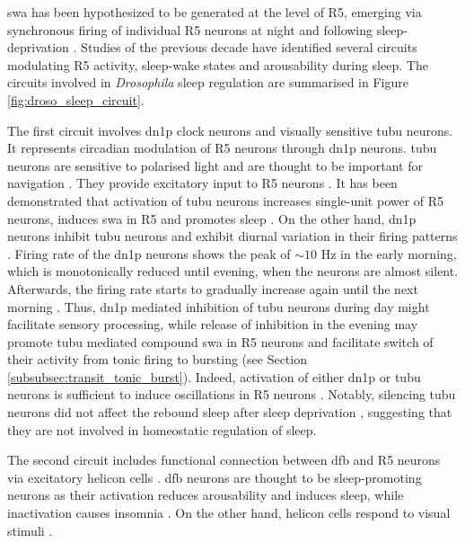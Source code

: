 \documentclass[../main.tex]{subfiles}
\begin{document}
\gls{swa} has been hypothesized to be generated at the level of R5, emerging via synchronous firing of individual R5 neurons at night and following sleep-deprivation \cite{raccugliaNetworkSpecificSynchronizationElectrical2019}.
Studies of the previous decade have identified several circuits modulating R5 activity, sleep-wake states and arousability during sleep. The circuits involved in \textit{Drosophila} sleep regulation are summarised in Figure \ref{fig:droso_sleep_circuit}.

The first circuit involves \gls{dn1p} clock neurons and visually sensitive \gls{tubu} neurons. It represents circadian modulation of R5 neurons through \gls{dn1p} neurons. \gls{tubu} neurons are sensitive to polarised light and are thought to be important for navigation \cite{suarez-grimaltNeuralArchitectureSleep2021}. They provide excitatory input to R5 neurons \cite{duanVisualPathwayCentral2023}. It has been demonstrated that activation of \gls{tubu} neurons increases single-unit power of R5 neurons, induces \gls{swa} in R5 and promotes sleep \cite{andreaniCircadianProgrammingEllipsoid2022,raccugliaNetworkSpecificSynchronizationElectrical2019}. On the other hand, \gls{dn1p} neurons inhibit \gls{tubu} neurons \cite{lamazeWakePromotingCircadianOutput2018} and exhibit diurnal variation in their firing patterns \cite{flourakisConservedBicycleModel2015}. Firing rate of the \gls{dn1p} neurons shows the peak of $\sim 10$ Hz in the early morning, which is monotonically reduced until evening, when the neurons are almost silent. Afterwards, the firing rate starts to gradually increase again until the next morning \cite{flourakisConservedBicycleModel2015}. Thus, \gls{dn1p} mediated inhibition of \gls{tubu} neurons during day might facilitate sensory processing, while release of inhibition in the evening may promote \gls{tubu} mediated compound \gls{swa} in R5 neurons and facilitate switch of their activity from tonic firing to bursting (see Section \ref{subsubsec:transit_tonic_burst}). Indeed, activation of either \gls{dn1p} or \gls{tubu} neurons is sufficient to induce oscillations in R5 neurons \cite{suarez-grimaltNeuralArchitectureSleep2021,raccugliaNetworkSpecificSynchronizationElectrical2019}. Notably, silencing \gls{tubu} neurons did not affect the rebound sleep after sleep deprivation \cite{andreaniCircadianProgrammingEllipsoid2022}, suggesting that they are not involved in homeostatic regulation of sleep.

The second circuit includes functional connection between \gls{dfb} and R5 neurons via excitatory helicon cells \cite{raccugliaCoherentMultilevelNetwork2022}. \gls{dfb} neurons are thought to be sleep-promoting neurons as their activation reduces arousability and induces sleep, while inactivation causes insomnia \cite{pimentelOperationHomeostaticSleep2016,suarez-grimaltNeuralArchitectureSleep2021}. On the other hand, helicon cells respond to visual stimuli \cite{shaferRegulationDrosophilaSleep2021}.
\end{document}
